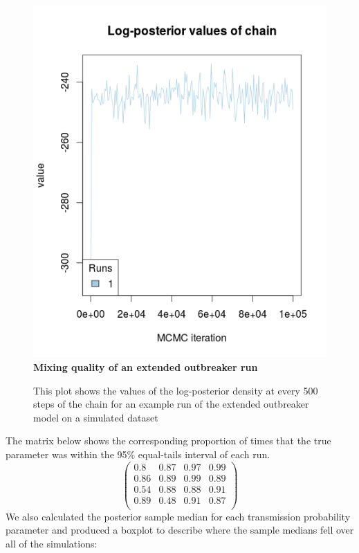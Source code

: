 \documentclass[11pt,a4paper]{report}
\begin{document}
\begin{figure}
\centering
\includegraphics[scale=0.6]{trace.png}
\newline
{\bf Mixing quality of an extended outbreaker run}
\caption{This plot shows the values of the log-posterior density at every 500 steps of the chain for an example run of the extended outbreaker model on a simulated dataset}
\end{figure}
The matrix below shows the corresponding proportion of times that the true parameter was within the 95\% equal-tails interval of each run.
\[\begin{pmatrix}
0.8 & 0.87 & 0.97 & 0.99 \\
0.86 & 0.89 & 0.99 & 0.89 \\
0.54 & 0.88 & 0.88 & 0.91 \\
0.89 & 0.48 & 0.91 & 0.87 \\
\end{pmatrix}\]
We also calculated the posterior sample median for each transmission probability parameter and produced a boxplot to describe where the sample medians fell over all of the simulations:
\end{document}
